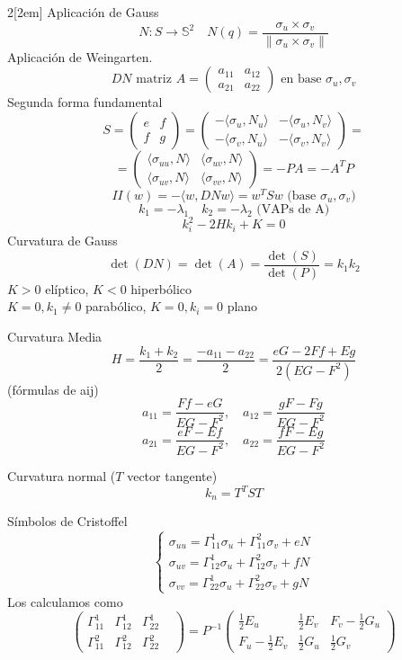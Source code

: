 \documentclass[leqno]{article}
\begin{document}
\begin{multicols}{2}[\columnsep2em]
Aplicación de Gauss
\[
N: S\to \mathbb{S}^2 \quad N(q) = \frac{\sigma _u\times \sigma _v}{\|\sigma _u\times \sigma _v\|}
\]
Aplicación de Weingarten.
\[
  DN \text{ matriz } A = \begin{pmatrix} a_{11} & a_{12} \\ a_{21} & a_{22} \end{pmatrix} \text{ en base }\sigma _u, \sigma _v 
\]
Segunda forma fundamental
\[
  S = \begin{pmatrix} e & f \\ f & g \end{pmatrix} = \begin{pmatrix} -\langle \sigma _u , N_u \rangle & -\langle \sigma _u , N_v \rangle \\ -\langle \sigma _v , N_u \rangle & -\langle \sigma _v , N_v \rangle   \end{pmatrix}= \]
  \[=   \begin{pmatrix} \langle \sigma _{uu} , N \rangle & \langle \sigma _{uv} , N \rangle \\ \langle \sigma _{uv} , N \rangle & \langle \sigma _{vv} , N \rangle   \end{pmatrix} =  -PA = -A^TP 
\]
\[
II(w) = -\langle w, DN w \rangle  = w^TSw \text{ (base } \sigma_u, \sigma _v)
\] 
\[
k_1=-\lambda_1 \quad k_2 = -\lambda_2 \text{  (VAPs de A)}
\] 
\[
  k_i^2 -2Hk_i+K = 0
\] 
Curvatura de Gauss
\[
\det(DN) = \det(A) = \frac{\det(S)}{\det(P)} = k_1k_2
\]
$K>0$ elíptico,  $K<0$ hiperbólico \\
$K=0, k_1\neq 0$ parabólico,  $K=0, k_i=0$ plano

Curvatura Media
\[
H = \frac{k_1+k_2}{2} = \frac{-a_{11}-a_{22}}{2}= \frac{eG-2Ff+Eg}{2(EG-F^2)}
\] 
(fórmulas de aij)
\[
a_{11} = \frac{Ff-eG}{EG-F^2}, \quad a_{12} = \frac{gF-Fg}{EG-F^2}
\] 
\[
  a_{21}=\frac{eF-Ef}{EG-F^2}, \quad a_{22} = \frac{fF-Eg}{EG-F^2}
\] 

Curvatura normal ($T$ vector tangente)
\[
k_n = T^TST
\] 

Símbolos de Cristoffel
  \[
  \begin{cases}
    \sigma _{uu} = \Gamma_{11}^1\sigma _u + \Gamma_{11}^2 \sigma _v + eN \\
    \sigma _{uv} = \Gamma_{12}^1\sigma _u + \Gamma_{12}^2 \sigma _v + fN \\
    \sigma _{vv} = \Gamma_{22}^1\sigma _u + \Gamma_{22}^2 \sigma _v + gN
  \end{cases}
  \]
Los calculamos como
\[
  \begin{pmatrix} \Gamma_{11}^1 & \Gamma_{12}^1 & \Gamma_{22}^1 \\ \Gamma_{11}^2 & \Gamma_{12}^2 & \Gamma_{22}^2 &  \end{pmatrix}  = P^{-1} \begin{pmatrix} \frac{1}{2}E_u & \frac{1}{2}E_v & F_v - \frac{1}{2}G_u \\ F_u - \frac{1}{2}E_v & \frac{1}{2}G_u & \frac{1}{2}G_v \end{pmatrix} 
\]


\end{multicols}
\end{document}
